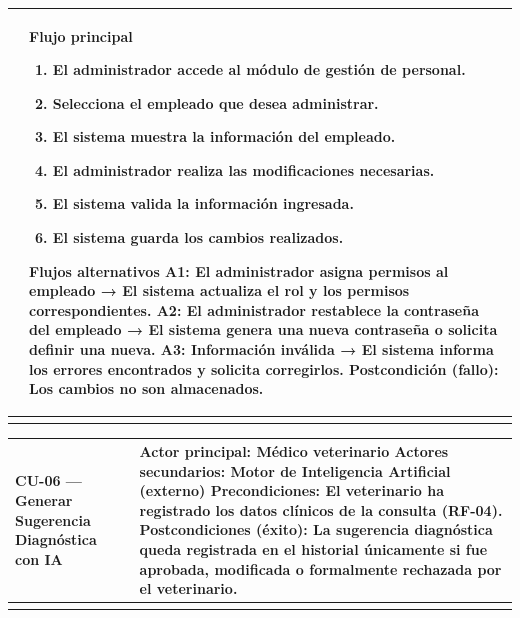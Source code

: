 \documentclass[
]{article}
\newcounter{none} %
\begin{document}
{\def\LTcaptype{none} %
\begin{longtable}[]{@{}
  >{\raggedright\arraybackslash}p{}
  >{\raggedright\arraybackslash}p{}@{}}
\toprule\noalign{}
\begin{minipage}[b]{\linewidth}\raggedright
\end{minipage} & \begin{minipage}[b]{\linewidth}\raggedright
\textbf{Flujo principal}

\begin{enumerate}
\def\labelenumi{\arabic{enumi}.}
\item
  El administrador accede al módulo de gestión de personal.
\item
  Selecciona el empleado que desea administrar.
\item
  El sistema muestra la información del empleado.
\item
  El administrador realiza las modificaciones necesarias.
\item
  El sistema valida la información ingresada.
\item
  El sistema guarda los cambios realizados.
\end{enumerate}

\textbf{Flujos alternativos} A1: El administrador asigna permisos al empleado → El sistema actualiza
el rol y los permisos correspondientes. A2: El administrador restablece la contraseña del empleado → El sistema
genera una nueva contraseña o solicita definir una nueva. A3: Información inválida → El sistema informa los errores encontrados y
solicita corregirlos. \textbf{Postcondición (fallo):} Los cambios no son almacenados.
\end{minipage} \\
\midrule\noalign{}
\endhead
\bottomrule\noalign{}
\endlastfoot
\end{longtable}
}

{\def\LTcaptype{none} %
\begin{longtable}[]{@{}
  >{\raggedright\arraybackslash}p{}
  >{\raggedright\arraybackslash}p{}@{}}
\toprule\noalign{}
\begin{minipage}[b]{\linewidth}\raggedright
CU-06 --- Generar Sugerencia Diagnóstica con IA
\end{minipage} & \begin{minipage}[b]{\linewidth}\raggedright
\textbf{Actor principal:} Médico veterinario \textbf{Actores
secundarios:} Motor de Inteligencia Artificial (externo)
\textbf{Precondiciones:} El veterinario ha registrado los datos clínicos
de la consulta (RF-04). \textbf{Postcondiciones (éxito):} La sugerencia diagnóstica queda
registrada en el historial únicamente si fue aprobada, modificada o
formalmente rechazada por el veterinario.
\end{minipage} \\
\midrule\noalign{}
\endhead
\bottomrule\noalign{}
\endlastfoot
\end{longtable}
}
\end{document}
